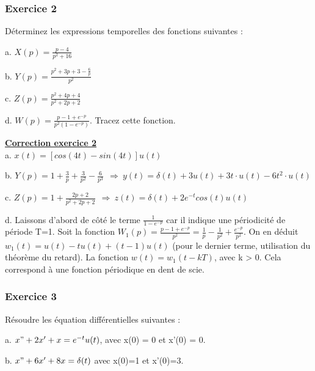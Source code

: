 \documentclass[11pt]{report}
\begin{document}
	\vspace{0.5\baselineskip}
	
	
	\subsubsection{Exercice 2}
	
	Déterminez les expressions temporelles des fonctions suivantes :
	
	a. $X(p)=\frac{p-4}{p^{2}+16}$ 
	
	b. $Y(p) = \frac{p^{2}+3p+3-\frac{6}{p}}{p^{2}}$ 
	
	c. $Z(p) = \frac{p^{2}+4p+4}{p^{2}+2p+2}$
	
	d. $W(p) = \frac{p-1+e^{-p}}{p^{2}(1-e^{-p})}$. Tracez cette fonction.
	
	
	\vspace{1\baselineskip}
	
	\textbf{\underline{Correction exercice 2}}\\
	
	a. $x(t)=[cos(4t)-sin(4t)]u(t)$
	
	b. $Y(p)=1+\frac{3}{p}+\frac{3}{p^{2}}-\frac{6}{p^{3}} ~~\Longrightarrow~ y(t)=\delta(t)+3u(t)+3t\cdot u(t)-6t^{2}\cdot u(t)$
	
	c. $Z(p)=1+\frac{2p+2}{p^{2}+2p+2}~~\Longrightarrow~z(t)=\delta(t)+2e^{-t}cos(t)u(t)$
	
	d. Laissons d'abord de côté le terme $\frac{1}{1-e^{-p}}$ car il indique une périodicité de période T=1. Soit la fonction $W_{1}(p)= \frac{p-1+e^{-p}}{p^{2}}=\frac{1}{p}-\frac{1}{p^{2}}+\frac{e^{-p}}{p^{2}}$. On en déduit $w_{1}(t)=u(t)-tu(t)+(t-1)u(t)$ (pour le dernier terme, utilisation du théorème du retard). La fonction $w(t) =w_{1}(t-kT)$, avec k > 0. Cela correspond à une fonction périodique en dent de scie.
	
	
	\vspace{1\baselineskip}
	
	\subsubsection{Exercice 3}
	
	Résoudre les équation différentielles suivantes :
	
	a. $x"+2x'+x=e^{-t}u(t)$, avec x(0) = 0 et x'(0) = 0. 
	
	b. $x"+6x'+8x=\delta(t)$ avec x(0)=1 et x'(0)=3. 
	
	\vspace{1\baselineskip}
	
\end{document}
